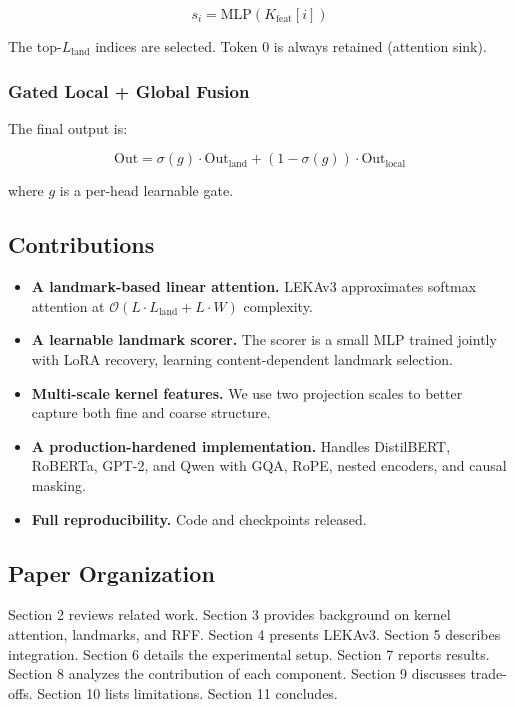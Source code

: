 \[
s_i = \text{MLP}(K_\text{feat}[i])
\tag{1.5}
\]

The top-$L_\text{land}$ indices are selected. Token 0 is always retained 
(attention sink).

\subsubsection{Gated Local + Global Fusion}

The final output is:

\[
\text{Out} = \sigma(g) \cdot \text{Out}_\text{land} + (1 - \sigma(g)) \cdot \text{Out}_\text{local}
\tag{1.6}
\]

where $g$ is a per-head learnable gate.

\subsection{Contributions}

\begin{itemize}
\item \textbf{A landmark-based linear attention.} LEKAv3 approximates softmax attention
  at $\mathcal{O}(L \cdot L_\text{land} + L \cdot W)$ complexity.
\item \textbf{A learnable landmark scorer.} The scorer is a small MLP trained jointly
  with LoRA recovery, learning content-dependent landmark selection.
\item \textbf{Multi-scale kernel features.} We use two projection scales to better
  capture both fine and coarse structure.
\item \textbf{A production-hardened implementation.} Handles DistilBERT, RoBERTa,
  GPT-2, and Qwen with GQA, RoPE, nested encoders, and causal masking.
\item \textbf{Full reproducibility.} Code and checkpoints released.

\end{itemize}
\subsection{Paper Organization}

Section 2 reviews related work. Section 3 provides background on kernel 
attention, landmarks, and RFF. Section 4 presents LEKAv3. Section 5 
describes integration. Section 6 details the experimental setup. Section 7 
reports results. Section 8 analyzes the contribution of each component. 
Section 9 discusses trade-offs. Section 10 lists limitations. Section 11 
concludes.



